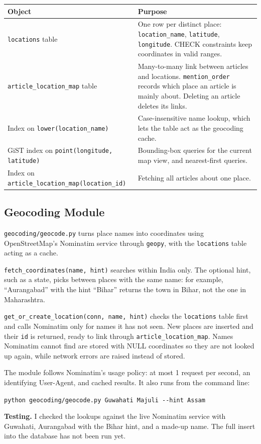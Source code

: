 \documentclass[11pt,a4paper]{article}
\begin{document}
\begin{center}
\begin{tabularx}{\textwidth}{@{}p{}L@{}}
\toprule
\textbf{Object} & \textbf{Purpose} \\
\midrule
\texttt{locations} table &
  One row per distinct place: \texttt{location\_name}, \texttt{latitude},
  \texttt{longitude}. CHECK constraints keep coordinates in valid ranges. \\
\texttt{article\_location\_map} table &
  Many-to-many link between articles and locations.
  \texttt{mention\_order} records which place an article is mainly about.
  Deleting an article deletes its links. \\
Index on \texttt{lower(location\_name)} &
  Case-insensitive name lookup, which lets the table act as the geocoding
  cache. \\
GiST index on \texttt{point(longitude, latitude)} &
  Bounding-box queries for the current map view, and nearest-first queries. \\
Index on \texttt{article\_location\_map}\allowbreak\texttt{(location\_id)} &
  Fetching all articles about one place. \\
\bottomrule
\end{tabularx}
\end{center}

\subsection{Geocoding Module}
\label{sec:geocoding}

\texttt{geocoding/geocode.py} turns place names into coordinates using
OpenStreetMap's Nominatim service through \texttt{geopy}, with the
\texttt{locations} table acting as a cache.

\texttt{fetch\_coordinates(name, hint)} searches within India only. The
optional hint, such as a state, picks between places with the same name: for
example, ``Aurangabad'' with the hint ``Bihar'' returns the town in Bihar, not
the one in Maharashtra.

\texttt{get\_or\_create\_location(conn, name, hint)} checks the
\texttt{locations} table first and calls Nominatim only for names it has not
seen. New places are inserted and their \texttt{id} is returned, ready to link
through \texttt{article\_location\_map}. Names Nominatim cannot find are
stored with NULL coordinates so they are not looked up again, while network
errors are raised instead of stored.

The module follows Nominatim's usage policy: at most 1 request per second, an
identifying User-Agent, and cached results. It also runs from the command
line:

\begin{center}
\texttt{python geocoding/geocode.py Guwahati Majuli -{}-hint Assam}
\end{center}

\textbf{Testing.} I checked the lookups against the live Nominatim service with
Guwahati, Aurangabad with the Bihar hint, and a made-up name. The full insert
into the database has not been run yet.
\end{document}
